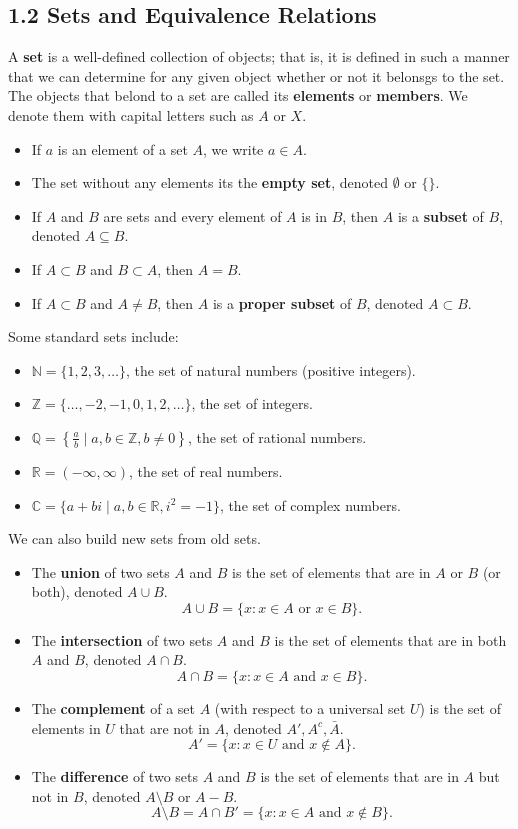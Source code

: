 \documentclass{article}
\newcommand{\R}{\mathbb{R}}
\newcommand{\N}{\mathbb{N}}
\newcommand{\Z}{\mathbb{Z}}
\newcommand{\Q}{\mathbb{Q}}
\newcommand{\C}{\mathbb{C}}
\begin{document}
\subsection{1.2 Sets and Equivalence Relations}
\begin{definition}
  A \textbf{set} is a well-defined collection of objects; that is, it is defined in such a manner that we can determine for any given object whether or not it belonsgs to the set. The objects that belond to a set are called its \textbf{elements} or \textbf{members}. We denote them with capital letters such as $A$ or $X$.

  \begin{itemize}
    \item If $a$ is an element of a set $A$, we write $a\in A$.
    \item The set without any elements its the \textbf{empty set}, denoted $\emptyset$ or $\{\}$.
    \item If $A$ and $B$ are sets and every element of $A$ is in $B$, then $A$ is a \textbf{subset} of $B$, denoted $A\subseteq B$.
    \item If $A\subset B$ and $B\subset A$, then $A=B$.
    \item If $A\subset B$ and $A\neq B$, then $A$ is a \textbf{proper subset} of $B$, denoted $A\subset B$.
  \end{itemize}
  Some standard sets include:
  \begin{itemize}
    \item $\N = \{1, 2, 3, \ldots\}$, the set of natural numbers (positive integers).
    \item $\Z = \{\ldots, -2, -1, 0, 1, 2, \ldots\}$, the set of integers.
    \item $\Q = \left\{\frac{a}{b} \mid a, b \in \Z, b \neq 0\right\}$, the set of rational numbers.
    \item $\R=(-\infty, \infty)$, the set of real numbers.
    \item $\C=\{a+bi \mid a,b\in \R, i^2=-1\}$, the set of complex numbers.
  \end{itemize}
\end{definition}
We can also build new sets from old sets.
\begin{itemize}
  \item The \textbf{union} of two sets $A$ and $B$ is the set of elements that are in $A$ or $B$ (or both), denoted $A\cup B$.
    \[A\cup B=\{x:x\in A\text{ or } x\in B\}.\]
  \item The \textbf{intersection} of two sets $A$ and $B$ is the set of elements that are in both $A$ and $B$, denoted $A\cap B$.
    \[A\cap B=\{x:x\in A\text{ and } x\in B\}.\]
  \item The \textbf{complement} of a set $A$ (with respect to a universal set $U$) is the set of elements in $U$ that are not in $A$, denoted $A',A^c,\bar{A}$.
    \[A'=\{x:x\in U\text{ and } x\notin A\}.\]
  \item The \textbf{difference} of two sets $A$ and $B$ is the set of elements that are in $A$ but not in $B$, denoted $A\setminus B$ or $A-B$.
    \[A\setminus B=A\cap B'=\{x:x\in A\text{ and } x\notin B\}.\]
\end{itemize}
\end{document}
